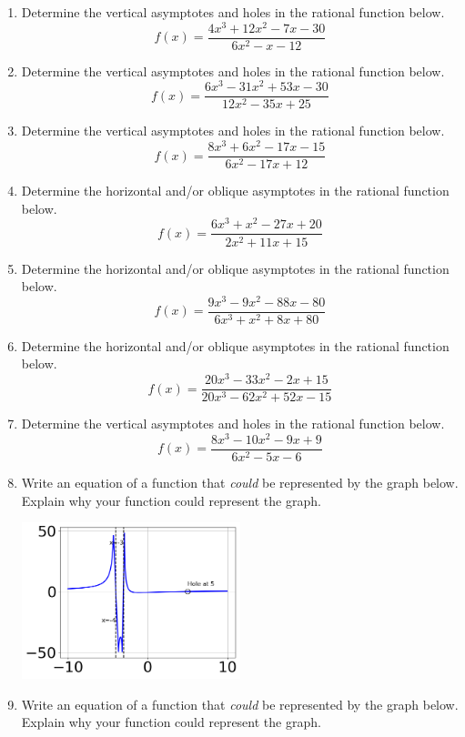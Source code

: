 \documentclass[14pt]{extbook}
\begin{document}
\begin{enumerate}
\item{
Determine the vertical asymptotes and holes in the rational function below.\[ f(x) = \frac{4x^{3} +12 x^{2} -7 x -30}{6x^{2} -x -12} \]} \newpage
\item{
Determine the vertical asymptotes and holes in the rational function below.\[ f(x) = \frac{6x^{3} -31 x^{2} +53 x -30}{12x^{2} -35 x + 25} \]} \newpage
\item{
Determine the vertical asymptotes and holes in the rational function below.\[ f(x) = \frac{8x^{3} +6 x^{2} -17 x -15}{6x^{2} -17 x + 12} \]} \newpage
\item{
Determine the horizontal and/or oblique asymptotes in the rational function below.\[ f(x) = \frac{6x^{3} + x^{2} -27 x + 20}{2x^{2} +11 x + 15} \]} \newpage
\item{
Determine the horizontal and/or oblique asymptotes in the rational function below.\[ f(x) = \frac{9x^{3} -9 x^{2} -88 x -80}{6x^{3} + x^{2} +8 x + 80} \]} \newpage
\item{
Determine the horizontal and/or oblique asymptotes in the rational function below.\[ f(x) = \frac{20x^{3} -33 x^{2} -2 x + 15}{20x^{3} -62 x^{2} +52 x -15} \]} \newpage
\item{
Determine the vertical asymptotes and holes in the rational function below.\[ f(x) = \frac{8x^{3} -10 x^{2} -9 x + 9}{6x^{2} -5 x -6} \]} \newpage
\item{
Write an equation of a function that \textit{could} be represented by the graph below. Explain why your function could represent the graph.
\begin{center}
    \includegraphics[width=0.5\textwidth]{../Figures/identifyGraphOfRationalFunctionB.png}
\end{center}
} \newpage
\item{
Write an equation of a function that \textit{could} be represented by the graph below. Explain why your function could represent the graph.
\begin{center}

\end{center}}
\end{enumerate}
\end{document}
